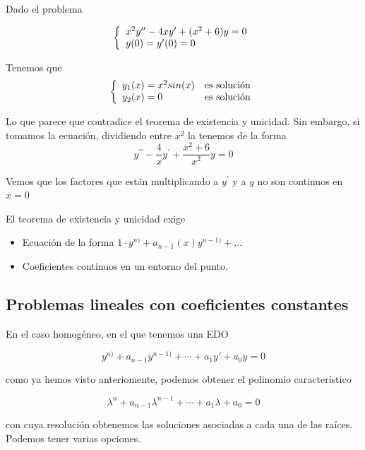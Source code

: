 \documentclass{mathnotes}
\begin{document}
\begin{example}
Dado el problema


\begin{equation}
\left\lbrace \begin{array}{l l}
	$$x^2y^{\prime\prime}-4xy^\prime+(x^2+6)y = 0$$\\
	y(0) = y^\prime(0) = 0
\end{array} \right. 
\end{equation}

Tenemos que
\begin{equation}
\left\lbrace \begin{array}{l l}
	y_1(x) = x^2sin(x) & \text{es solución}\\
	y_2(x) = 0 & \text{es solución}
\end{array} \right. 
\end{equation}

Lo que parece que contradice el teorema de existencia y unicidad. Sin embargo, si tomamos la ecuación, dividiendo entre $x^2$ la tenemos de la forma
$$y^{\prime\prime}-\frac{4}{x}y^\prime + \frac{x^2+6}{x^2}y = 0$$

Vemos que los factores que están multiplicando a $y^\prime$ y a $y$ no son continuos en $x=0$
\end{example}

\obs
El teorema de existencia y unicidad exige
\begin{itemize}
\item Ecuación de la forma $1\cdot y^{n)}+a_{n-1}(x)y^{n-1)}+\hdots$
\item Coeficientes continuos en un entorno del punto.
\end{itemize}

\subsection{Problemas lineales con coeficientes constantes}
\label{secEcHomoLinealConstante}
En el caso homogéneo, en el que tenemos una EDO

\[ y^{n)} + a_{n-1}y^{n-1)} + \dotsb + a_1y' + a_0 y = 0 \]

como ya hemos visto anteriomente, podemos obtener el polinomio característico

\[ λ^n + a_{n-1}λ^{n-1} + \dotsb + a_1λ + a_0 = 0 \]

con cuya resolución obtenemos las soluciones asociadas a cada una de las raíces. Podemos tener varias opciones.
\end{document}
